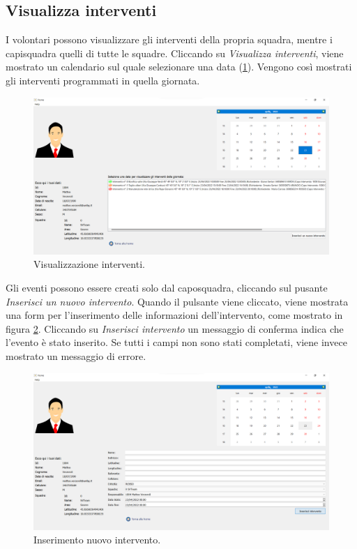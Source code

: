 \subsection{Visualizza interventi}
I volontari possono visualizzare gli interventi della propria squadra, mentre i capisquadra quelli di tutte le squadre. Cliccando su \textit{Visualizza interventi}, viene mostrato un calendario sul quale selezionare una data (\Fig\ref{fig:view_operation}). Vengono così mostrati gli interventi programmati in quella giornata.
\begin{figure}[h!]
	\centering
	\includegraphics[width=1\linewidth]{./ImageFiles/view_operation.png}
	\caption{Visualizzazione interventi.}
	\label{fig:view_operation}
\end{figure}

Gli eventi possono essere creati solo dal caposquadra, cliccando sul pusante \textit{Inserisci un nuovo intervento}.
Quando il pulsante viene cliccato, viene mostrata una form per l'inserimento delle informazioni dell'intervento, come mostrato in figura \ref{fig:new_op}. Cliccando su \textit{Inserisci intervento} un messaggio di conferma indica che l'evento è stato inserito. Se tutti i campi non sono stati completati, viene invece mostrato un messaggio di errore.
\begin{figure}[h!]
	\centering
	\includegraphics[width=1\linewidth]{./ImageFiles/new_op.png}
	\caption{Inserimento nuovo intervento.}
	\label{fig:new_op}
\end{figure}

